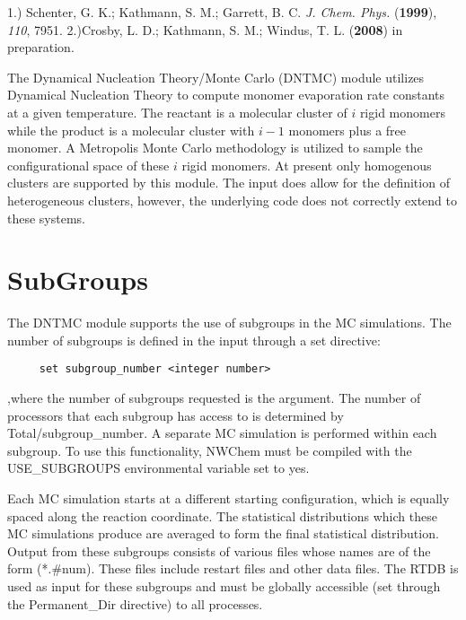 
%
\label{sec:dntmc} 1.)  Schenter, G. K.; Kathmann, S. M.; Garrett, B.
C. {\it J. Chem. Phys.} ({\bf 1999}), {\it 110}, 7951. 2.)Crosby, L.
D.; Kathmann, S. M.; Windus, T. L. ({\bf 2008}) in preparation.

 The Dynamical Nucleation Theory/Monte Carlo
(DNTMC) module utilizes Dynamical Nucleation Theory to compute monomer
evaporation rate constants at a given temperature.  The reactant is
a molecular cluster of $i$ rigid monomers while the product is a
molecular cluster with $i-1$ monomers plus a free monomer.  A
Metropolis Monte Carlo methodology is utilized to sample the
configurational space of these $i$ rigid monomers.  At present only
homogenous clusters are supported by this module.  The input does
allow for the definition of heterogeneous clusters, however, the
underlying code does not correctly extend to these systems.

\section{SubGroups}

The DNTMC module supports the use of subgroups in the MC
simulations.  The number of subgroups is defined in the input
through a set directive:
\begin{verbatim}
     set subgroup_number <integer number>
\end{verbatim}
,where the number of subgroups requested is the argument.  The
number of processors that each subgroup has access to is determined
by Total/subgroup\_number.  A separate MC simulation is performed
within each subgroup.  To use this functionality, NWChem must be
compiled with the USE\_SUBGROUPS environmental variable set to yes.

Each MC simulation starts at a different starting configuration,
which is equally spaced along the reaction coordinate.  The
statistical distributions which these MC simulations produce are
averaged to form the final statistical distribution.  Output from
these subgroups consists of various files whose names are of the
form (*.\#num). These files include restart files and other data
files.  The RTDB is used as input for these subgroups and must be
globally accessible (set through the Permanent\_Dir directive) to
all processes.

